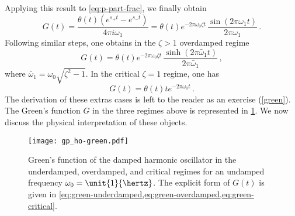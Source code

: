 Applying this result to \cref{eq:p-part-frac}, we finally obtain
\begin{equation}
  G(t)=\frac{\theta(t)(e^{s_+t}-e^{s_-t})}{4\pi i\omega_1}
  =\theta(t)e^{-2\pi\omega_0\zeta t}\,\frac{\sin(2\pi\omega_1t)}{2\pi\omega_1}\,.
  \label{eq:green-underdamped}
\end{equation}
Following similar steps, one obtains in the $\zeta>1$ overdamped regime
\begin{equation}
  G(t)=\theta(t)e^{-2\pi\omega_0\zeta t}\,
  \frac{\sinh(2\pi\bar{\omega}_1t)}{2\pi\bar{\omega}_1}\,,
  \label{eq:green-overdamped}
\end{equation}
where $\bar{\omega}_1=\omega_0\sqrt{\zeta^2-1}$. In the critical $\zeta=1$ regime, one has
\begin{equation}
  G(t)=\theta(t)te^{-2\pi\omega_0 t}\,.
  \label{eq:green-critical}
\end{equation}
The derivation of these extras cases is left to the reader as an exercise
(\cf\cref{green}). The Green's function $G$ in the three regimes above is represented in
\cref{fig:ho-green}. We now discuss the physical interpretation of these objects.
\begin{figure}[t]
  \centering
  \texttt{[image: gp\_ho-green.pdf]}
  \caption{Green's function of the damped harmonic oscillator in the underdamped,
    overdamped, and critical regimes for an undamped frequency $\omega_0=\unit{1}{\hertz}$.
    The explicit form of $G(t)$ is given in
  \cref{eq:green-underdamped,eq:green-overdamped,eq:green-critical}.}
  \label{fig:ho-green}
\end{figure}
